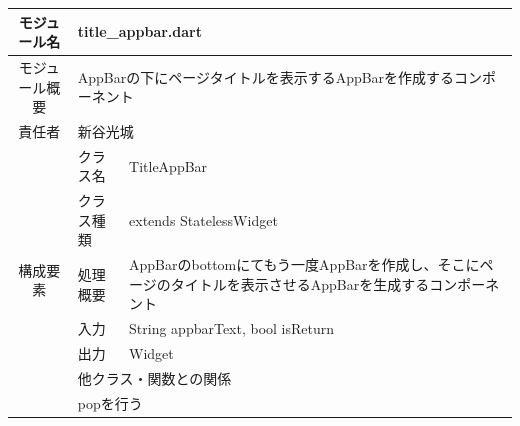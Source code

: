 \begin{table}[H]
  \centering
  \begin{tabular}{|c|l|l|} \hline
    モジュール名                & \multicolumn{2}{l|}{title\_appbar.dart}                                                                                                                           \\ \hline
    モジュール概要               & \multicolumn{2}{p{12cm}|}{AppBarの下にページタイトルを表示するAppBarを作成するコンポーネント}                                                                                                \\ \hline
    責任者                   & \multicolumn{2}{l|}{新谷光城}                                                                                                                                         \\ \hline
    \multirow{7}{*}{構成要素} & クラス名                                                               & TitleAppBar                                                                                  \\ \cline{2-3}
                          & クラス種類                                                              & extends StatelessWidget                                                                      \\ \cline{2-3}
                          & 処理概要                                                               & \multicolumn{1}{p{12cm}|}{AppBarのbottomにてもう一度AppBarを作成し、そこにページのタイトルを表示させるAppBarを生成するコンポーネント} \\ \cline{2-3}
                          & 入力                                                                 & String appbarText, bool isReturn                                                             \\ \cline{2-3}
                          & 出力                                                                 & Widget                                                                                       \\ \cline{2-3}
                          & \multicolumn{2}{l|}{他クラス・関数との関係}                                                                                                                                  \\ \cline{2-3}
                          & \multicolumn{2}{p{14cm}|}{popを行う}                                                                                                                                 \\ \hline
  \end{tabular}
\end{table}

